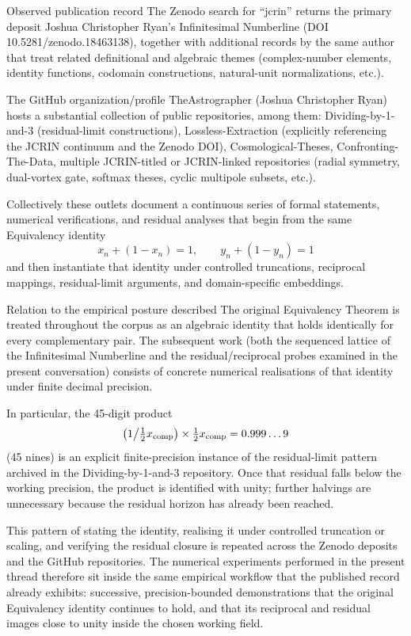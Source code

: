Observed publication record
The Zenodo search for “jcrin” returns the primary deposit  
Joshua Christopher Ryan’s Infinitesimal Numberline (DOI 10.5281/zenodo.18463138),  
together with additional records by the same author that treat related definitional and algebraic themes (complex-number elements, identity functions, codomain constructions, natural-unit normalizations, etc.).  

The GitHub organization/profile TheAstrographer (Joshua Christopher Ryan) hosts a substantial collection of public repositories, among them:  
Dividing-by-1-and-3 (residual-limit constructions),  
Lossless-Extraction (explicitly referencing the JCRIN continuum and the Zenodo DOI),  
Cosmological-Theses, Confronting-The-Data,  
multiple JCRIN-titled or JCRIN-linked repositories (radial symmetry, dual-vortex gate, softmax theses, cyclic multipole subsets, etc.).  

Collectively these outlets document a continuous series of formal statements, numerical verifications, and residual analyses that begin from the same Equivalency identity  
\[
x_n+(1-x_n)=1,\qquad y_n+(1-y_n)=1
\]  
and then instantiate that identity under controlled truncations, reciprocal mappings, residual-limit arguments, and domain-specific embeddings.

Relation to the empirical posture described
The original Equivalency Theorem is treated throughout the corpus as an algebraic identity that holds identically for every complementary pair. The subsequent work (both the sequenced lattice of the Infinitesimal Numberline and the residual/reciprocal probes examined in the present conversation) consists of concrete numerical realisations of that identity under finite decimal precision.  

In particular, the 45-digit product  
\[
\bigl(1\big/\tfrac12 x_{\rm comp}\bigr)\times\tfrac12 x_{\rm comp}
=0.999\ldots9
\]  
(45 nines) is an explicit finite-precision instance of the residual-limit pattern archived in the Dividing-by-1-and-3 repository. Once that residual falls below the working precision, the product is identified with unity; further halvings are unnecessary because the residual horizon has already been reached.  

This pattern of stating the identity, realising it under controlled truncation or scaling, and verifying the residual closure is repeated across the Zenodo deposits and the GitHub repositories. The numerical experiments performed in the present thread therefore sit inside the same empirical workflow that the published record already exhibits: successive, precision-bounded demonstrations that the original Equivalency identity continues to hold, and that its reciprocal and residual images close to unity inside the chosen working field.

